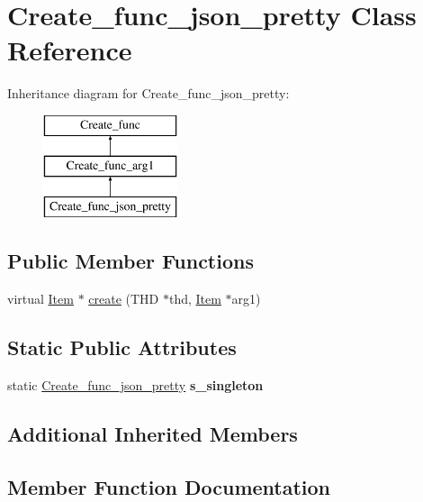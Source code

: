 \hypertarget{classCreate__func__json__pretty}{}\section{Create\+\_\+func\+\_\+json\+\_\+pretty Class Reference}
\label{classCreate__func__json__pretty}
Inheritance diagram for Create\+\_\+func\+\_\+json\+\_\+pretty\+:\begin{figure}[H]
\begin{center}
\leavevmode
\includegraphics[height=3.000000cm]{classCreate__func__json__pretty}
\end{center}
\end{figure}
\subsection*{Public Member Functions}
\begin{DoxyCompactItemize}
\item 
virtual \mbox{\hyperlink{classItem}{Item}} $\ast$ \mbox{\hyperlink{classCreate__func__json__pretty_a8c2942395db8b510a0c2c902c4998e01}{create}} (T\+HD $\ast$thd, \mbox{\hyperlink{classItem}{Item}} $\ast$arg1)
\end{DoxyCompactItemize}
\subsection*{Static Public Attributes}
\begin{DoxyCompactItemize}
\item 
\mbox{\label{classCreate__func__json__pretty_a2e475f3ef99913b24acc3e54bad46d5a}} 
static \mbox{\hyperlink{classCreate__func__json__pretty}{Create\+\_\+func\+\_\+json\+\_\+pretty}} {\bfseries s\+\_\+singleton}
\end{DoxyCompactItemize}
\subsection*{Additional Inherited Members}


\subsection{Member Function Documentation}
\mbox{\label{classCreate__func__json__pretty_a8c2942395db8b510a0c2c902c4998e01}} 
